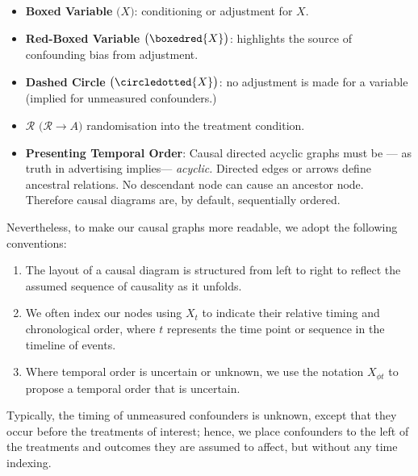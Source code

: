 \documentclass[
  single column]{article}
\providecommand{\tightlist}{%
  \setlength{\itemsep}{0pt}\setlength{\parskip}{0pt}}\usepackage{longtable,booktabs,array}
\begin{document}
\begin{itemize}
{  effect-modification that we project on the graph.} It would be
  possible, however, to replace these open blue arrows with ordinary
  nodes together with an explanation that we draw the edges not for
  identification by for generalisation (see
  )
\item
  \textbf{Boxed Variable} \(\big(\boxed{X}\big)\): conditioning or
  adjustment for \(X\).
\item
  \textbf{Red-Boxed Variable} \(\big(\boxedred{X}\big)\): highlights the
  source of confounding bias from adjustment.
\item
  \textbf{Dashed Circle} \(\big( \circledotted{X}\big)\): no adjustment
  is made for a variable (implied for unmeasured confounders.)
\item
  \textbf{\(\mathbf{\mathcal{R}}\)}
  \(\big(\mathcal{R} \rightarrow A\big)\) randomisation into the
  treatment condition.
\item
  \textbf{Presenting Temporal Order}: Causal directed acyclic graphs
  must be --- as truth in advertising implies--- \emph{acyclic.}
  Directed edges or arrows define ancestral relations. No descendant
  node can cause an ancestor node. Therefore causal diagrams are, by
  default, sequentially ordered.
\end{itemize}

Nevertheless, to make our causal graphs more readable, we adopt the
following conventions:

\begin{enumerate}
\def\labelenumi{\arabic{enumi}.}
\tightlist
\item
  The layout of a causal diagram is structured from left to right to
  reflect the assumed sequence of causality as it unfolds.
\item
  We often index our nodes using \(X_t\) to indicate their relative
  timing and chronological order, where \(t\) represents the time point
  or sequence in the timeline of events.
\item
  Where temporal order is uncertain or unknown, we use the notation
  \(X_{\phi t}\) to propose a temporal order that is uncertain.
\end{enumerate}

Typically, the timing of unmeasured confounders is unknown, except that
they occur before the treatments of interest; hence, we place
confounders to the left of the treatments and outcomes they are assumed
to affect, but without any time indexing.
\end{document}

